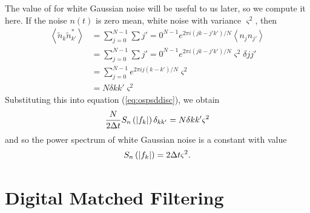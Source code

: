The value of \ospsd for white Gaussian noise will be useful to us later, so we
compute it here. If the noise $n(t)$ is zero mean, white noise with variance
$\varsigma^2$, then
\begin{equation}
\begin{split}
\left\langle \tilde{n}_k \tilde{n}_{k'}^\ast \right\rangle 
&= \sum_{j=0}^{N-1} \sum{j'=0}^{N-1} e^{2\pi i \left(jk - j'k'\right) / N}
\left\langle n_j n_{j'} \right\rangle \\
&= \sum_{j=0}^{N-1} \sum{j'=0}^{N-1} e^{2\pi i \left(jk - j'k'\right) / N}
\varsigma^2 \delta{jj'} \\
&= \sum_{j=0}^{N-1} e^{2\pi i j \left(k - k'\right) / N} \varsigma^2 \\
&= N \delta{kk'} \varsigma^2
\end{split}
\end{equation}
Substituting this into equation (\ref{eq:ospsddisc}), we obtain
\begin{equation}
\frac{N}{2\Delta t}S_n\left(\left|f_{k}\right|\right)\delta_{kk'} = N \delta{kk'} \varsigma^2
\end{equation}
and so the power spectrum of white Gaussian noise is a constant with value
\begin{equation}
S_n\left(\left|f_{k}\right|\right) = 2\Delta t \varsigma^2.
\end{equation}

\section{Digital Matched Filtering}
\label{s:matchedfilter}

